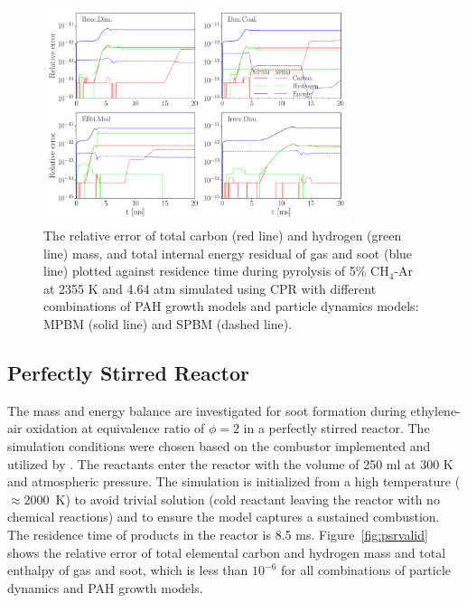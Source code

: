 \begin{figure}[H]
	\centering
	\includegraphics[width=0.8\textwidth]{Figures/Results/Validation/CPR/relerr_cpr.pdf}
	\caption{The relative error of total carbon (red line) and hydrogen (green line) mass, and total internal energy residual of gas and soot (blue line) plotted against residence time during pyrolysis of 5\% $\mathrm{CH_4}$-Ar at 2355 K and 4.64 atm simulated using CPR with different combinations of PAH growth models and particle dynamics models: MPBM (solid line) and SPBM (dashed line).}
	\label{fig:cprvalid}
\end{figure}

\subsection{Perfectly Stirred Reactor}
\label{sec:psrvalid}
The mass and energy balance are investigated for soot formation during ethylene-air oxidation at equivalence ratio of $\phi=2$ in a perfectly stirred reactor. The simulation conditions were chosen based on the combustor implemented and utilized by \citet{stouffer2002combustion}. The reactants enter the reactor with the volume of 250 ml at 300 K and atmospheric pressure. The simulation is initialized from a high temperature ($\approx2000$~K) to avoid trivial solution (cold reactant leaving the reactor with no chemical reactions) and to ensure the model captures a sustained combustion. The residence time of products in the reactor is 8.5 ms. Figure~\ref{fig:psrvalid} shows the relative error of total elemental carbon and hydrogen mass and total enthalpy of gas and soot, which is less than $10^{-6}$ for all combinations of particle dynamics and PAH growth models.

